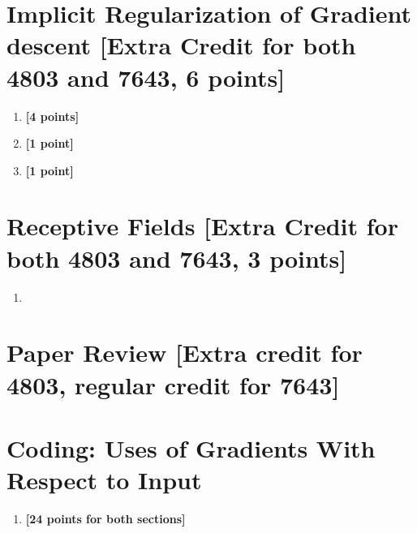 \documentclass[11pt,english]{article}
\begin{document}
    

\section{Implicit Regularization of Gradient descent [Extra Credit for both 4803 and 7643, 6 points]}

\begin{enumerate}[resume]

\item
\textbf{[4 points]}


\item
\textbf{[1 point]}


\item
\textbf{[1 point]}

    
\end{enumerate}


\section{Receptive Fields [Extra Credit for both 4803 and 7643, 3 points]}
\begin{enumerate}[resume]
\item 

\end{enumerate}

\section{Paper Review [Extra credit for 4803, regular credit for 7643]}



\section{Coding: Uses of Gradients With Respect to Input}

\begin{enumerate}[resume]

\item
\textbf{[24 points for both sections]}


\end{enumerate}
\end{document}
